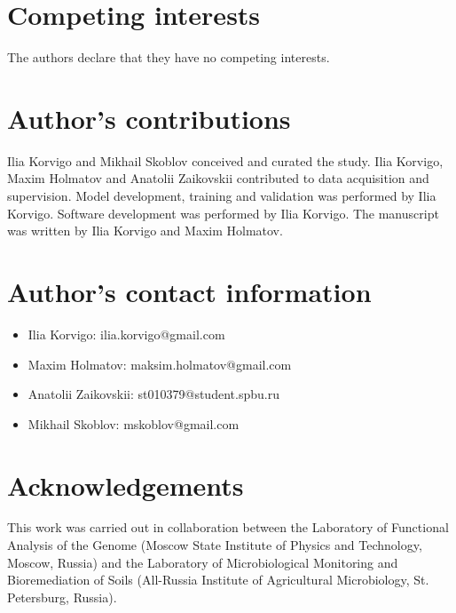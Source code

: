 \documentclass[twocolumn]{bmcart}%
\begin{document}
\begin{backmatter}

\section*{Competing interests}
The authors declare that they have no competing interests. 

\section*{Author's contributions}
Ilia Korvigo and Mikhail Skoblov conceived and curated the study. 
Ilia Korvigo, Maxim Holmatov and Anatolii Zaikovskii contributed to data acquisition and supervision.
Model development, training and validation was performed by Ilia Korvigo.
Software development was performed by Ilia Korvigo.
The manuscript was written by Ilia Korvigo and Maxim Holmatov.

\section*{Author's contact information}

\begin{itemize}
	\item Ilia Korvigo: ilia.korvigo@gmail.com
	\item Maxim Holmatov: maksim.holmatov@gmail.com
	\item Anatolii Zaikovskii: st010379@student.spbu.ru
	\item Mikhail Skoblov: mskoblov@gmail.com
\end{itemize}

\section*{Acknowledgements}
This work was carried out in collaboration between the Laboratory of Functional Analysis of the Genome (Moscow State Institute of Physics and Technology, Moscow, Russia) and the Laboratory of Microbiological Monitoring and Bioremediation of Soils (All-Russia Institute of Agricultural Microbiology, St. Petersburg, Russia).



\end{backmatter}
\end{document}
